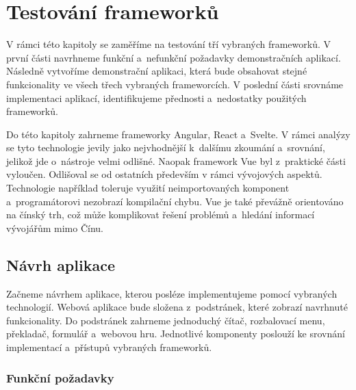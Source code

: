 \section{Testování frameworků}

V rámci této kapitoly se zaměříme na testování tří vybraných frameworků. V první části navrhneme funkční a~nefunkční požadavky demonstračních aplikací. 
Následně vytvoříme demonstrační aplikaci, která bude obsahovat stejné funkcionality ve všech třech vybraných frameworcích. 
V poslední části srovnáme implementaci aplikací, identifikujeme přednosti a~nedostatky použitých frameworků.

Do této kapitoly zahrneme frameworky Angular, React a~Svelte. V rámci analýzy se tyto technologie jevily jako nejvhodnější k~dalšímu zkoumání a~srovnání, jelikož jde o~nástroje velmi odlišné. 
Naopak framework Vue byl z~praktické části vyloučen. Odlišoval se od ostatních především v rámci vývojových aspektů. 
Technologie například toleruje využití neimportovaných komponent a~programátorovi nezobrazí kompilační chybu. 
Vue je také převážně orientováno na čínský trh, což může komplikovat řešení problémů a~hledání informací vývojářům mimo Čínu.

\subsection{Návrh aplikace}

Začneme návrhem aplikace, kterou posléze implementujeme pomocí vybraných technologií. 
Webová aplikace bude složena z~podstránek, které zobrazí navrhnuté funkcionality. 
Do podstránek zahrneme jednoduchý čítač, rozbalovací menu, překladač, formulář a~webovou hru. 
Jednotlivé komponenty poslouží ke srovnání implementací a~přístupů vybraných frameworků.

\subsubsection{Funkční požadavky}

